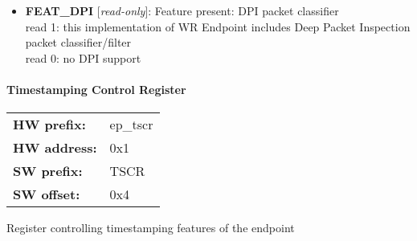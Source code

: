\begin{itemize}
\begin{small}
\\
read 1: this implementation of WR Endpoint can timestamp packets\\                      read 0: no timestamping support
\end{small}
\item \begin{small}
{\bf 
FEAT\_DPI
} [\emph{read-only}]: Feature present: DPI packet classifier
\\
read 1: this implementation of WR Endpoint includes Deep Packet Inspection packet classifier/filter\\                      read 0: no DPI support
\end{small}
\end{itemize}
\paragraph*{Timestamping Control Register}\vspace{12pt}

\begin{tabular}{l l }
{\bf HW prefix:}  & ep\_tscr\\
{\bf HW address:}  & 0x1\\
{\bf SW prefix:}  & TSCR\\
{\bf SW offset:}  & 0x4\\
\end{tabular}

\vspace{12pt}
Register controlling timestamping features of the endpoint

\vspace{12pt}
\noindent
{}

